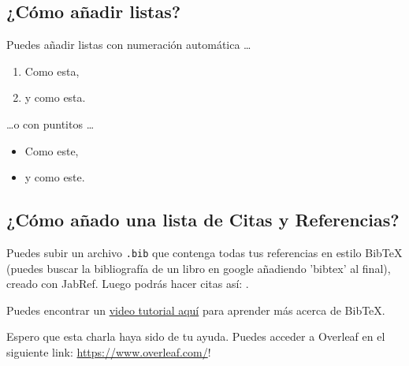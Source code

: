 \documentclass[a4paper]{article}
\begin{document}
	\subsection{¿Cómo añadir listas?}
	
	Puedes añadir listas con numeración automática \dots
	
	\begin{enumerate}
		\item Como esta,
		\item y como esta.
	\end{enumerate}
	\dots o con puntitos \dots
	\begin{itemize}
		\item Como este,
		\item y como este.
	\end{itemize}
	
	\subsection{¿Cómo añado una lista de Citas y Referencias?}
	
	Puedes subir un archivo \verb|.bib| que contenga todas tus referencias en estilo BibTeX (puedes buscar la bibliografía de un libro en google añadiendo 'bibtex' al final), creado con JabRef. Luego podrás hacer citas así: \cite{Griffiths:1492149}.
	
	Puedes encontrar un \href{https://www.overleaf.com/help/97-how-to-include-a-bibliography-using-bibtex}{video tutorial aquí} para aprender más acerca de BibTeX.
	
	Espero que esta charla haya sido de tu ayuda. Puedes acceder a Overleaf en el siguiente link: \url{https://www.overleaf.com/}!
	
	
	
	
\end{document}
